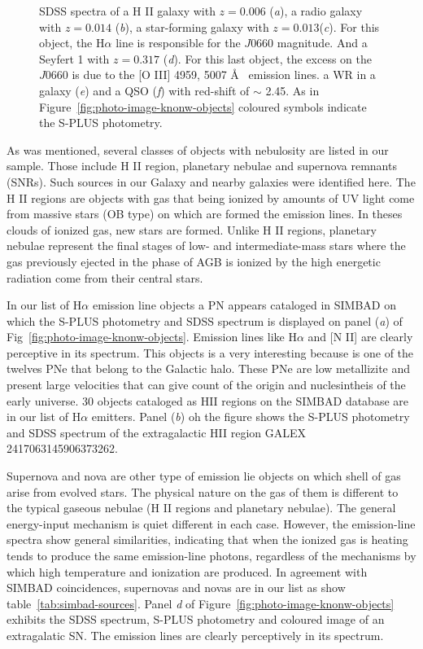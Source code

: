 \documentclass[fleqn,usenatbib]{mnras}
\begin{document}
\begin{figure}
\begin{tabular}{ll}
  \end{tabular}
  \caption{SDSS spectra of a H II galaxy with $z = 0.006$ (\textit{a}), a radio galaxy with $z = 0.014$ (\textit{b}), 
  a star-forming galaxy with $z = 0.013$(\textit{c}). For this object, the H{$\alpha$} line 
  is responsible for the $J0660$ magnitude. And a Seyfert 1 with $z = 0.317$ (\textit{d}). For this last object, the excess on the $J0660$ is due to the [O III] 4959, 5007 \AA~ emission lines. a WR in a galaxy (\textit{e}) 
          and a QSO (\textit{f}) with red-shift of $\sim$ 2.45.  As in Figure~\ref{fig:photo-image-knonw-objects} coloured symbols indicate the S-PLUS photometry.}
  \label{fig:photo-image-knonw-objects2}
\end{figure}

As was mentioned, several classes of objects with nebulosity are listed in our sample. 
Those include H II region, planetary nebulae and supernova
remnants (SNRs). Such sources in our Galaxy and nearby galaxies were
identified here. The H II regions are objects with gas that being ionized by
amounts of UV light come from massive stars (OB type) on which
are formed the emission lines. In theses clouds of ionized gas,
new stars are formed. Unlike H II regions, planetary nebulae
represent the final stages of low- and intermediate-mass stars
where the gas previously ejected in the phase of AGB is ionized
by the high energetic radiation come from their central stars.

In our list of H{$\alpha$} emission line objects a PN appears cataloged in SIMBAD 
on which the S-PLUS photometry and SDSS spectrum is displayed on panel (\textit{a}) 
of Fig~\ref{fig:photo-image-knonw-objects}. Emission lines like H{$\alpha$} 
and [N II] are clearly perceptive in its spectrum.
This objects is a very interesting because is one of the twelves PNe that belong
to the Galactic halo. These PNe are low metallizite and present large velocities that
can give count of the origin and nuclesintheis of the early universe. 30 objects 
cataloged as HII regions on the SIMBAD database are in our list of H{$\alpha$} emitters. 
Panel (\textit{b}) oh the figure shows the S-PLUS photometry and SDSS spectrum 
of the extragalactic HII region GALEX 2417063145906373262.  

Supernova and nova are other type of emission lie objects on which shell of gas arise from
evolved stars. The physical nature on the gas of them is different to the typical gaseous 
nebulae (H II regions and planetary nebulae). The general energy-input mechanism is quiet 
different in each case. 
However, the emission-line spectra show general similarities, indicating that when the 
ionized gas is heating tends 
to produce the same emission-line photons, regardless of the mechanisms by which 
high temperature and ionization are produced. 
In agreement with SIMBAD coincidences, supernovas and novas are 
in our list as show table~\ref{tab:simbad-sources}. Panel \textit{d} of
Figure~\ref{fig:photo-image-knonw-objects} exhibits the SDSS spectrum, S-PLUS 
photometry and coloured image of an extragalatic SN. The emission lines are 
clearly perceptively in its spectrum. 
\end{document}
